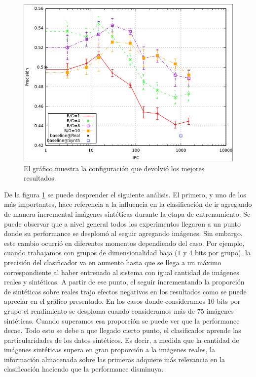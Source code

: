 			\begin{figure}[!htbp]
				\centering
				\centerline{
					\includegraphics[scale=0.6]{img/resultados/mixtas/best_mean_2040.png}
				}
				\caption[Mixtas media mejor resultado]{El gráfico muestra la configuración que devolvió los mejores resultados.}
				\label{fig: Mixtas-media-mejor}
			\end{figure}

	De la figura \ref{fig: Mixtas-media-mejor} se puede desprender el siguiente análisis. El primero, y uno de los más importantes, hace referencia a la influencia en la clasificación de ir agregando de manera incremental imágenes sintéticas durante la etapa de entrenamiento. Se puede observar que a nivel general todos los experimentos llegaron a un punto donde su performance se desplomó al seguir agregando imágenes. Sin embargo, este cambio ocurrió en diferentes momentos dependiendo del caso. Por ejemplo, cuando trabajamos con grupos de dimensionalidad baja ($1$ y $4$ bits por grupo), la precisión del clasificador va en aumento hasta que se llega a un máximo correspondiente al haber entrenado al sistema con igual cantidad de imágenes reales y sintéticas. A partir de ese punto, el seguir incrementando la proporción de sintéticas sobre reales trajo efectos negativos en los resultados como se puede apreciar en el gráfico presentado. En los casos donde consideramos $10$ bits por grupo el rendimiento se desploma cuando consideramos más de 75 imágenes sintéticas. Cuando superamos esa proporción se puede ver que la performance decae. Todo esto se debe a que llegado cierto punto, el clasificador aprende las particularidades de los datos sintéticos. Es decir, a medida que la cantidad de imágenes sintéticas supera en gran proporción a la imágenes reales, la información almacenada sobre las primeras adquiere más relevancia en la clasificación haciendo que la performance disminuya.

